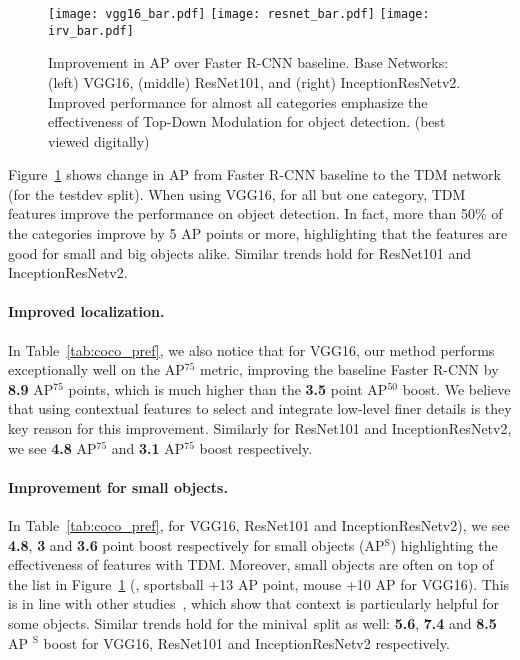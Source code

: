 \documentclass[10pt,twocolumn,letterpaper]{article}
\newcommand{\minival}{minival\raisebox{0.2ex}{$\ast$}}
\begin{document}
\begin{figure}
    \centering
    \texttt{[image: vgg16\_bar.pdf]} 
    \texttt{[image: resnet\_bar.pdf]} 
    \texttt{[image: irv\_bar.pdf]} 
    \caption{Improvement in AP over Faster R-CNN baseline. Base Networks: (left) VGG16, (middle) ResNet101, and (right) InceptionResNetv2. Improved performance for almost all categories emphasize the effectiveness of Top-Down Modulation for object detection. (best viewed digitally)}
    \label{fig:distribution}
    \vspace{-0.1in}
\end{figure}


Figure~\ref{fig:distribution} shows change in AP from Faster R-CNN baseline to the TDM network (for the testdev split). When using VGG16, for all but one category, TDM features improve the performance on object detection. In fact, more than 50\% of the categories improve by 5 AP points or more, highlighting that the features are good for small and big objects alike. Similar trends hold for ResNet101 and InceptionResNetv2.

\vspace{-0.1in}
\paragraph{Improved localization.} In Table~\ref{tab:coco_pref}, we also notice that for VGG16, our method performs exceptionally well on the AP$^\text{75}$ metric, improving the baseline Faster R-CNN by \textbf{8.9} AP$^\text{75}$ points, which is much higher than the \textbf{3.5} point AP$^\text{50}$ boost. We believe that using contextual features to select and integrate low-level finer details is they key reason for this improvement. Similarly for ResNet101 and InceptionResNetv2, we see \textbf{4.8} AP$^\text{75}$ and \textbf{3.1} AP$^\text{75}$ boost respectively.

\vspace{-0.1in}
\paragraph{Improvement for small objects.} In Table~\ref{tab:coco_pref}, for VGG16, ResNet101 and InceptionResNetv2), we see \textbf{4.8}, \textbf{3} and \textbf{3.6} point boost respectively for small objects (AP$^\text{S}$) highlighting the effectiveness of features with TDM. Moreover, small objects are often on top of the list in Figure~\ref{fig:distribution} (\eg, sportsball +13 AP point, mouse +10 AP for VGG16). This is in line with other studies~\cite{gupta2015exploring}, which show that context is particularly helpful for some objects. Similar trends hold for the \minival\ split as well: \textbf{5.6}, \textbf{7.4} and \textbf{8.5} AP $^\text{S}$ boost for VGG16, ResNet101 and InceptionResNetv2 respectively.
\end{document}
